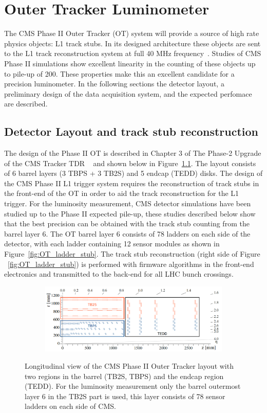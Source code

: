 \chapter{Outer Tracker Luminometer}

The CMS Phase II Outer Tracker  (OT) system will provide a source of high rate physics objects: L1 track stubs.
In its designed architecture these objects are sent to the L1 track reconstruction system at full 40 MHz frequency~\cite{CERN-LHCC-2017-009}.
Studies of CMS Phase II simulations show excellent linearity in the counting of these objects up to pile-up of 200.
These properties make this an excellent candidate for a precision luminometer.
In the following sections the detector layout, a preliminary design of the data acquisition system, and the expected perfomace are described.


\section{Detector Layout and track stub reconstruction}

The design of the Phase II OT is described in Chapter 3 of The Phase-2 Upgrade of the CMS Tracker TDR ~\cite{CERN-LHCC-2017-009} and shown below in Figure~\ref{fig:OT_layout}.
The layout consists of 6 barrel layers (3 TBPS + 3 TB2S) and 5 endcap (TEDD) disks.
The design of the CMS Phase II L1 trigger system requires the reconstruction of track stubs in the front-end of the OT in order to aid the track reconstruction for the L1 trigger.
For the luminosity measurement, CMS detector simulations have been studied up to the Phase II expected pile-up,
these studies described below show that the best precision can be obtained with the track stub counting from the barrel layer 6. 
The OT barrel layer 6 consists of 78 ladders on each side of the detector, with each ladder containing 12 sensor modules as shown in Figure~\ref{fig:OT_ladder_stub}.
The track stub reconstruction (right side of Figure ~\ref{fig:OT_ladder_stub}) is performed with firmware algorithms in the front-end electronics and transmitted to the back-end for all LHC bunch crossings.


\begin{figure}[hbtp]
\centering
\begin{subfigure}
\centering
\includegraphics[width=.9\linewidth]{tex/Part2/fig/OT/OT-longitudinal.png}
\end{subfigure}
\caption{
  Longitudinal view of the CMS Phase II Outer Tracker layout  with two regions in the barrel (TB2S, TBPS) and the endcap region (TEDD).
  For the luminosity measurement only the barrel outermost layer 6 in the TB2S part is used, this layer consists of 78 sensor ladders on each side of CMS.
}
\label{fig:OT_layout}
\end{figure}


